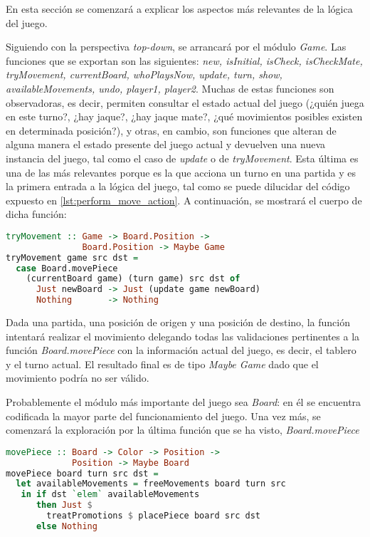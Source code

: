 \documentclass{llncs}
\begin{document}
En esta sección se comenzará a explicar los aspectos más relevantes de la lógica del juego.

Siguiendo con la perspectiva \textit{top-down}, se arrancará por el módulo \textit{Game}. Las funciones que se exportan son las siguientes: \textit{new, isInitial, isCheck, isCheckMate, tryMovement, currentBoard, whoPlaysNow, update, turn, show, availableMovements, undo, player1, player2}. Muchas de estas funciones son observadoras, es decir, permiten consultar el estado actual del juego (¿quién juega en este turno?, ¿hay jaque?, ¿hay jaque mate?, ¿qué movimientos posibles existen en determinada posición?), y otras, en cambio, son funciones que alteran de alguna manera el estado presente del juego actual y devuelven una nueva instancia del juego, tal como el caso de \textit{update} o de \textit{tryMovement}. Esta última es una de las más relevantes porque es la que acciona un turno en una partida y es la primera entrada a la lógica del juego, tal como se puede dilucidar del código expuesto en \ref{lst:perform_move_action}. A continuación, se mostrará el cuerpo de dicha función:


\begin{lstlisting}[frame=single, language=haskell, captionpos=b, caption=Función tryMovement, label={lst:try_movement}]
tryMovement :: Game -> Board.Position ->
               Board.Position -> Maybe Game
tryMovement game src dst =
  case Board.movePiece
    (currentBoard game) (turn game) src dst of
      Just newBoard -> Just (update game newBoard)
      Nothing       -> Nothing
\end{lstlisting}

Dada una partida, una posición de origen y una posición de destino, la función intentará realizar el movimiento delegando todas las validaciones pertinentes a la función \textit{Board.movePiece} con la información actual del juego, es decir, el tablero y el turno actual. El resultado final es de tipo \textit{Maybe Game} dado que el movimiento podría no ser válido.

Probablemente el módulo más importante del juego sea \textit{Board}: en él se encuentra codificada la mayor parte del funcionamiento del juego. Una vez más, se comenzará la exploración por la última función que se ha visto, \textit{Board.movePiece}


\begin{lstlisting}[frame=single, language=haskell, captionpos=b, caption=Función movePiece, label={lst:move_piece}]
movePiece :: Board -> Color -> Position ->
             Position -> Maybe Board
movePiece board turn src dst =
  let availableMovements = freeMovements board turn src
   in if dst `elem` availableMovements
      then Just $
        treatPromotions $ placePiece board src dst
      else Nothing
\end{lstlisting}
\end{document}
